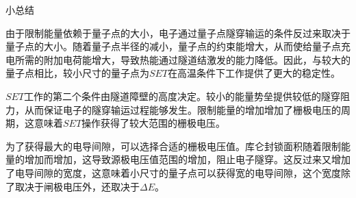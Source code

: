 \documentclass{beamer}[fontset=windows]
\begin{document}
    \begin{frame}
    \begin{block}{小总结}
    \begin{itemize}\small{
    \item 由于限制能量依赖于量子点的大小，电子通过量子点隧穿输运的条件反过来取决于量子点的大小。随着量子点半径的减小，量子点的约束能增大，从而使给量子点充电所需的附加电荷能增大，导致热能通过隧道结激发的能力降低。因此，与较大的量子点相比，较小尺寸的量子点为$SET$在高温条件下工作提供了更大的稳定性。
    \item $SET$工作的第二个条件由隧道障壁的高度决定。较小的能量势垒提供较低的隧穿阻力，从而保证电子的隧穿输运过程能够发生。限制能量的增加增加了栅极电压的周期，这意味着$SET$操作获得了较大范围的栅极电压。
    \item 为了获得最大的电导间隙，可以选择合适的栅极电压值。库仑封锁面积随着限制能量的增加而增加，这导致源极电压值范围的增加，阻止电子隧穿。这反过来又增加了电导间隙的宽度，这意味着小尺寸的量子点可以获得宽的电导间隙，这个宽度除了取决于闸极电压外，还取决于$\Delta E$。}
    \end{itemize}
    \end{block}
    \end{frame}
\end{document}
